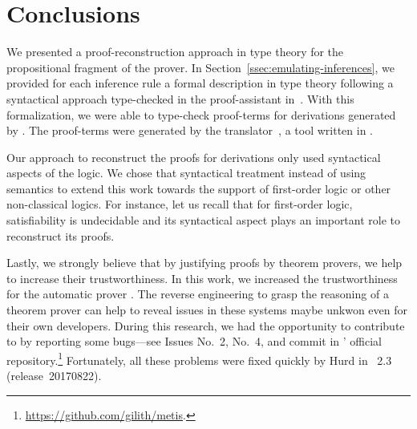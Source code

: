 \documentclass[../main.tex]{subfiles}
\begin{document}

\section{Conclusions}
\label{sec:conclusions}

We presented a proof-reconstruction approach in type theory for the
propositional fragment of the \Metis prover. In
Section~\ref{ssec:emulating-inferences}, we provided for each \Metis inference
rule a formal description in type theory following a syntactical approach
type-checked in the proof-assistant \Agda in~\cite{AgdaProp,AgdaMetis}. With
this formalization, we were able to type-check \Agda proof-terms for
\TSTP derivations generated by \Metis. The \Agda proof-terms were generated by
the \Athena translator~\cite{Athena}, a tool written in \Haskell.


Our approach to reconstruct the proofs for \Metis \TSTP derivations only used
syntactical aspects of the logic. We chose that syntactical treatment instead of
using semantics to extend this work towards the support of first-order logic or
other non-classical logics. For instance, let us recall that
for first-order logic, satisfiability is undecidable and its syntactical aspect
plays an important role to reconstruct its proofs.

Lastly, we strongly believe that by justifying proofs by theorem provers, we
help to increase their trustworthiness. In this work, we increased the
trustworthiness for the automatic prover \Metis. The reverse engineering to
grasp the reasoning of a theorem prover can help to reveal issues in these
systems maybe unkwon even for their own developers. During this research, we had
the opportunity to contribute to \Metis by reporting some bugs---see Issues
No.~2, No.~4, and commit  in \Metis' official
repository.\footnote{\url{https://github.com/gilith/metis}.} Fortunately, all
these problems were fixed quickly by Hurd in \Metis~2.3 (release~20170822).
\end{document}
